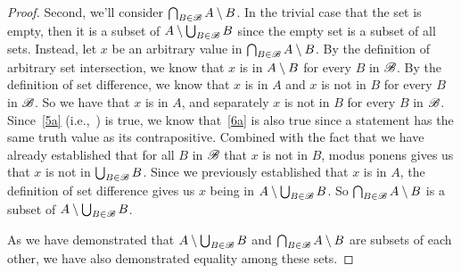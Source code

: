 \documentclass[main.tex]{subfiles}
\begin{document}
\begin{proof}
	\medskip{}
	Second, we'll consider
	\(\bigcap_{B \in \mathscr{B}} {A \setminus B}\). In the
	trivial case that the set is empty, then it is a subset of
	\(A \setminus \bigcup_{B \in \mathscr{B}} {B}\) since the empty set
	is a subset of all sets. Instead, let \(x\) be an arbitrary value in
	\(\bigcap_{B \in \mathscr{B}} {A \setminus B}\). By the
	definition of arbitrary set intersection, we know that \(x\) is in
	\(A \setminus B\) for every \(B\) in \(\mathscr{B}\). By the definition
	of set difference, we know that \(x\) is in \(A\) and \(x\) is not in
	\(B\) for every \(B\) in \(\mathscr{B}\). So we have that \(x\) is in
	\(A\), and separately \(x\) is not in \(B\) for every \(B\) in
	\(\mathscr{B}\). Since~\ref{5a} (i.e.,~) is true, we know
	that~\ref{6a} is also true since a statement has the same truth value as
	its contrapositive. Combined with the fact that we have already
	established that for all \(B\) in \(\mathscr{B}\) that \(x\) is not in
	\(B\), modus ponens gives us that \(x\) is not in
	\(\bigcup_{B \in \mathscr{B}} {B}\). Since we previously
	established that \(x\) is in \(A\), the definition of set difference
	gives us \(x\) being in
	\(A \setminus \bigcup_{B \in \mathscr{B}} {B}\). So
	\(\bigcap_{B \in \mathscr{B}} {A \setminus B}\) is a subset
	of \(A \setminus \bigcup_{B \in \mathscr{B}} {B}\).

	\medskip{}
	As we have demonstrated that
	\(A \setminus \bigcup_{B \in \mathscr{B}} {B}\) and
	\(\bigcap_{B \in \mathscr{B}} {A \setminus B}\) are subsets
	of each other, we have also demonstrated equality among these sets.
\end{proof}
\end{document}
